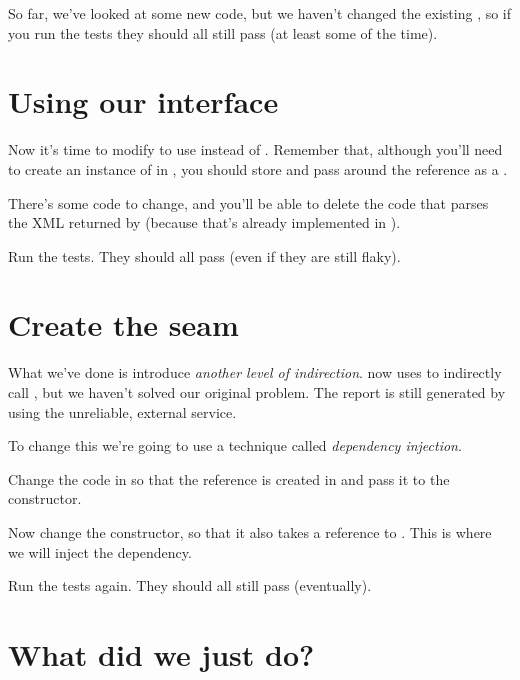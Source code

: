So far, we've looked at some new code, but we haven't changed the existing \texttt{\ShoutyStatsService}, so if you run the tests they should all still pass (at least some of the time).

\section*{Using our interface}

\begin{sloppypar}
Now it's time to modify \texttt{\ShoutyReportProcessor} to use \texttt{\ProductionRevenueProvider} instead of \texttt{\ShoutyStatsService}. Remember that, although you'll need to create an instance of \texttt{\ProductionRevenueProvider} in \texttt{\ShoutyReportProcessor}, you should store and pass around the reference as a \texttt{\RevenueProviderInterface}.

There's some code to change, and you'll be able to delete the code that parses the XML returned by \texttt{\ShoutyStatsService} (because that's already implemented in  \texttt{\ProductionRevenueProvider}).

Run the tests. They should all pass (even if they are still flaky).
\end{sloppypar}

\section*{Create the seam}

What we've done is introduce \emph{another level of indirection}. \texttt{\ShoutyReportProcessor} now uses \texttt{\RevenueProviderInterface} to indirectly call \texttt{\ShoutyStatsService}, but we haven't solved our original problem. The report is still generated by using the unreliable, external service.

To change this we're going to use a technique called \emph{dependency injection}.

\begin{sloppypar}

Change the code in \texttt{\ShoutyReportJob} so that the \texttt{\RevenueProviderInterface} reference is created in \texttt{\ShoutyReportJob} and pass it to the \texttt{\ShoutyReportProcessor} constructor.  

Now change the \texttt{\ShoutyReportProcessor} constructor, so that it also takes a reference to \texttt{\RevenueProviderInterface}. This is where we will inject the dependency.
\end{sloppypar}


Run the tests again. They should all still pass (eventually).  

\section*{What did we just do?}

